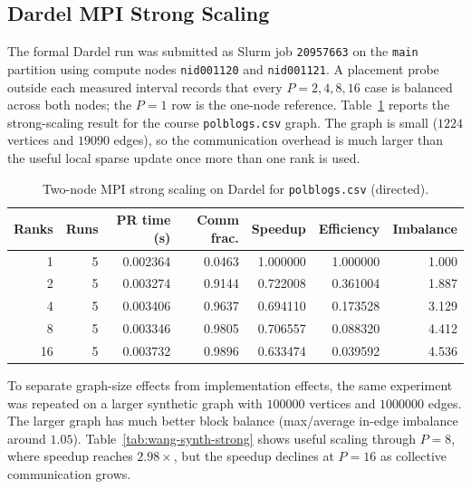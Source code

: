 \documentclass[11pt]{article}
\begin{document}
\subsection{Dardel MPI Strong Scaling}
\label{subsec:wang-dardel-strong}

The formal Dardel run was submitted as Slurm job \texttt{20957663} on the
\texttt{main} partition using compute nodes \texttt{nid001120} and
\texttt{nid001121}. A placement probe outside each measured interval records
that every $P=2,4,8,16$ case is balanced across both nodes; the $P=1$ row is
the one-node reference. Table~\ref{tab:wang-polblogs-strong} reports the
strong-scaling result for the course \texttt{polblogs.csv} graph. The graph is small
($1224$ vertices and $19090$ edges), so the communication overhead is much
larger than the useful local sparse update once more than one rank is used.

\begin{table}[H]
\centering
\caption{Two-node MPI strong scaling on Dardel for \texttt{polblogs.csv} (directed).}
\label{tab:wang-polblogs-strong}
\begin{tabular}{rrrrrrr}
\toprule
Ranks & Runs & PR time (s) & Comm frac. & Speedup & Efficiency & Imbalance \\
\midrule
1  & 5 & 0.002364 & 0.0463 & 1.000000 & 1.000000 & 1.000 \\
2  & 5 & 0.003274 & 0.9144 & 0.722008 & 0.361004 & 1.887 \\
4  & 5 & 0.003406 & 0.9637 & 0.694110 & 0.173528 & 3.129 \\
8  & 5 & 0.003346 & 0.9805 & 0.706557 & 0.088320 & 4.412 \\
16 & 5 & 0.003732 & 0.9896 & 0.633474 & 0.039592 & 4.536 \\
\bottomrule
\end{tabular}
\end{table}

To separate graph-size effects from implementation effects, the same experiment
was repeated on a larger synthetic graph with $100000$ vertices and
$1000000$ edges. The larger graph has much better block balance
(max/average in-edge imbalance around $1.05$). Table~\ref{tab:wang-synth-strong}
shows useful scaling through $P=8$, where speedup reaches $2.98\times$, but
the speedup declines at $P=16$ as collective communication grows.
\end{document}

